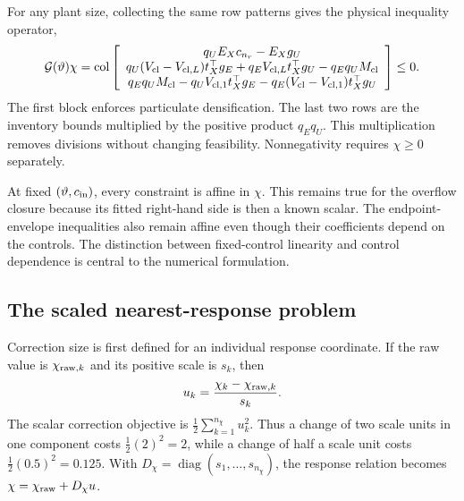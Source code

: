For any plant size, collecting the same row patterns gives the physical inequality operator,
\begin{equation}
\mathcal G(\vartheta)\chi=
\operatorname{col}\left[
\begin{array}{c}
q_UE_Xc_{n_r}-E_Xg_U\\
q_U(V_{\rm cl}-V_{{\rm cl},L})t_X^\top g_E
+q_EV_{{\rm cl},L}t_X^\top g_U-q_Eq_UM_{\rm cl}\\
q_Eq_UM_{\rm cl}-q_UV_{{\rm cl},1}t_X^\top g_E
-q_E(V_{\rm cl}-V_{{\rm cl},1})t_X^\top g_U
\end{array}\right]\le0.
\label{eq:plant_projection_inequalities}
\end{equation}
The first block enforces particulate densification. The last two rows are the inventory bounds multiplied by the positive product $q_Eq_U$. This multiplication removes divisions without changing feasibility. Nonnegativity requires $\chi\ge0$ separately.

At fixed $(\vartheta,c_{\rm in})$, every constraint is affine in $\chi$. This remains true for the overflow closure because its fitted right-hand side is then a known scalar. The endpoint-envelope inequalities also remain affine even though their coefficients depend on the controls. The distinction between fixed-control linearity and control dependence is central to the numerical formulation.

\subsection{The scaled nearest-response problem}

Correction size is first defined for an individual response coordinate. If the raw value is $\chi_{{\rm raw},k}$ and its positive scale is $s_k$, then
\begin{equation}
u_k=\frac{\chi_k-\chi_{{\rm raw},k}}{s_k}.
\end{equation}
The scalar correction objective is $\tfrac12\sum_{k=1}^{n_\chi}u_k^2$. Thus a change of two scale units in one component costs $\tfrac12(2)^2=2$, while a change of half a scale unit costs $\tfrac12(0.5)^2=0.125$. With $D_\chi=\operatorname{diag}(s_1,\ldots,s_{n_\chi})$, the response relation becomes $\chi=\chi_{\rm raw}+D_\chi u$.

